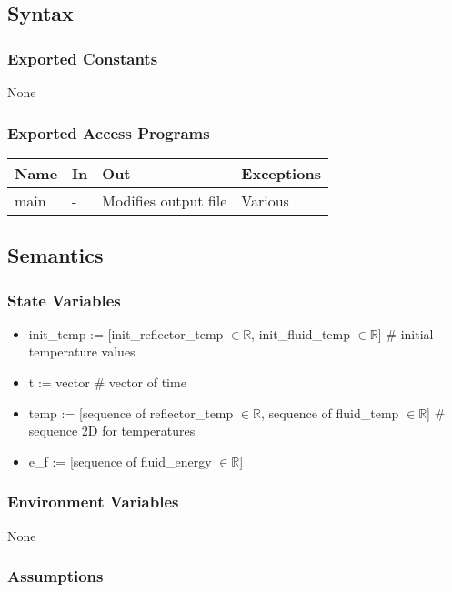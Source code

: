 \documentclass[12pt, titlepage]{article}
\begin{document}
\subsection{Syntax}

\subsubsection{Exported Constants}
None
\subsubsection{Exported Access Programs}

\begin{center}
\begin{tabular}{p{2cm} p{4cm} p{4cm} p{2cm}}
\hline
\textbf{Name} & \textbf{In} & \textbf{Out} & \textbf{Exceptions} \\
\hline
main & - & Modifies output file & Various \\
\hline
\end{tabular}
\end{center}

\subsection{Semantics}

\subsubsection{State Variables}
\begin{itemize}
    \item init\_temp := [init\_reflector\_temp $\in \mathbb{R}$, init\_fluid\_temp $\in \mathbb{R}$] \# initial temperature values 
    \item t := vector \# vector of time
    \item temp := [sequence of reflector\_temp $\in \mathbb{R}$, sequence of fluid\_temp $\in \mathbb{R}$] \# sequence 2D for temperatures
    \item e\_f := [sequence of fluid\_energy $\in \mathbb{R}$]
\end{itemize}

\subsubsection{Environment Variables}

None

\subsubsection{Assumptions}
\end{document}
